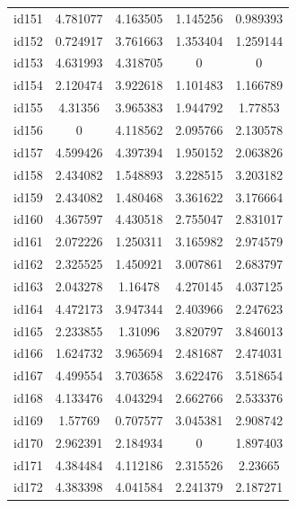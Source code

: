 \documentclass[entropy,article,submit,moreauthors,LaTeX and dvi2pdf]{Definitions/mdpi}
\begin{document}
\begin{center}
\begin{longtable}{ccccc}
id151     & 4.781077  & 4.163505       & 1.145256          & 0.989393          \\
id152     & 0.724917  & 3.761663       & 1.353404          & 1.259144          \\
id153     & 4.631993  & 4.318705       & 0                 & 0                 \\
id154     & 2.120474  & 3.922618       & 1.101483          & 1.166789          \\
id155     & 4.31356   & 3.965383       & 1.944792          & 1.77853           \\
id156     & 0         & 4.118562       & 2.095766          & 2.130578          \\
id157     & 4.599426  & 4.397394       & 1.950152          & 2.063826          \\
id158     & 2.434082  & 1.548893       & 3.228515          & 3.203182          \\
id159     & 2.434082  & 1.480468       & 3.361622          & 3.176664          \\
id160     & 4.367597  & 4.430518       & 2.755047          & 2.831017          \\
id161     & 2.072226  & 1.250311       & 3.165982          & 2.974579          \\
id162     & 2.325525  & 1.450921       & 3.007861          & 2.683797          \\
id163     & 2.043278  & 1.16478        & 4.270145          & 4.037125          \\
id164     & 4.472173  & 3.947344       & 2.403966          & 2.247623          \\
id165     & 2.233855  & 1.31096        & 3.820797          & 3.846013          \\
id166     & 1.624732  & 3.965694       & 2.481687          & 2.474031          \\
id167     & 4.499554  & 3.703658       & 3.622476          & 3.518654          \\
id168     & 4.133476  & 4.043294       & 2.662766          & 2.533376          \\
id169     & 1.57769   & 0.707577       & 3.045381          & 2.908742          \\
id170     & 2.962391  & 2.184934       & 0                 & 1.897403          \\
id171     & 4.384484  & 4.112186       & 2.315526          & 2.23665           \\
id172     & 4.383398  & 4.041584       & 2.241379          & 2.187271          \\

\end{longtable}
\end{center}
\end{document}
